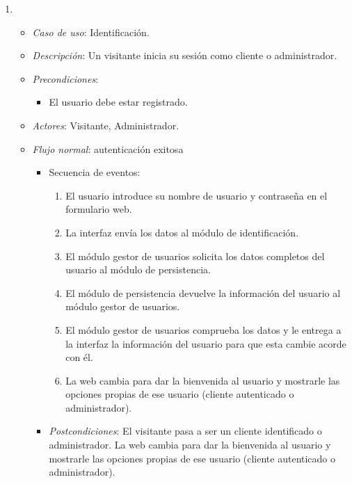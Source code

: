 \begin{enumerate}[{\bf UC-1}]

\item 
  \begin{itemize}
  \item {\it Caso de uso}: Identificación.
  \item {\it Descripción}: Un visitante inicia su sesión como cliente o administrador.
  \item {\it Precondiciones}:
    \begin{itemize}
    \item El usuario debe estar registrado.
    \end{itemize}
  \item {\it Actores}: Visitante, Administrador.  
  
  
  \item {\it Flujo normal}: autenticación exitosa
    \begin{itemize}
    \item Secuencia de eventos:
      \begin{enumerate}[1. ]
      \item El usuario introduce su nombre de usuario y contraseña en el formulario web.
      \item La interfaz envía los datos al módulo de identificación.
      \item El módulo gestor de usuarios solicita los datos completos del usuario al módulo de persistencia.
      \item El módulo de persistencia devuelve la información del usuario al módulo gestor de usuarios.
      \item El módulo gestor de usuarios comprueba los datos y le entrega a la interfaz la información del usuario para que esta cambie acorde con él.
      \item La web cambia para dar la bienvenida al usuario y mostrarle las opciones propias de ese usuario (cliente autenticado o administrador).
      \end{enumerate}
    
    \item {\it Postcondiciones}: El visitante pasa a ser un cliente identificado o administrador.  La web cambia para dar la bienvenida al usuario y mostrarle las opciones propias de ese usuario (cliente autenticado o administrador).
    \end{itemize}

    

\end{itemize}
\end{enumerate}
